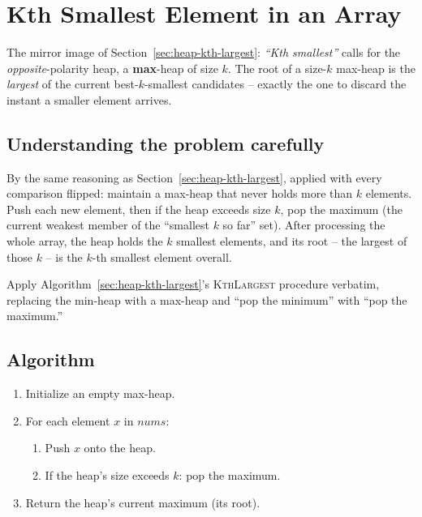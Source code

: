 \section{Kth Smallest Element in an Array}
\label{sec:heap-kth-smallest}


\begin{patternbox}
The mirror image of Section~\ref{sec:heap-kth-largest}: \emph{``Kth
smallest''} calls for the \emph{opposite}-polarity heap, a
\textbf{max}-heap of size $k$. The root of a size-$k$ max-heap is the
\emph{largest} of the current best-$k$-smallest candidates -- exactly the
one to discard the instant a smaller element arrives.
\end{patternbox}

\subsection*{Understanding the problem carefully}

By the same reasoning as Section~\ref{sec:heap-kth-largest}, applied with
every comparison flipped: maintain a max-heap that never holds more than
$k$ elements. Push each new element, then if the heap exceeds size $k$,
pop the maximum (the current weakest member of the ``smallest $k$
so far'' set). After processing the whole array, the heap holds the $k$
smallest elements, and its root -- the largest of those $k$ -- is the
$k$-th smallest element overall.

\begin{ideabox}
Apply Algorithm~\ref{sec:heap-kth-largest}'s \textsc{KthLargest} procedure
verbatim, replacing the min-heap with a max-heap and ``pop the minimum''
with ``pop the maximum.''
\end{ideabox}

\subsection*{Algorithm}

\begin{enumerate}
  \item Initialize an empty max-heap.
  \item For each element $x$ in $\textit{nums}$:
  \begin{enumerate}
    \item Push $x$ onto the heap.
    \item If the heap's size exceeds $k$: pop the maximum.
  \end{enumerate}
  \item Return the heap's current maximum (its root).
\end{enumerate}

